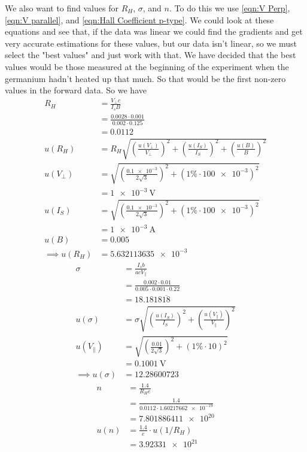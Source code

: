 \documentclass[12pt]{article}
\numberwithin{equation}{section}
\numberwithin{figure}{section}
\numberwithin{table}{section}
\begin{document}
    We also want to find values for $R_H$, $\sigma$, and $n$. To do this we use 
    \autoref{eqn:V Perp}, \autoref{eqn:V parallel}, and \autoref{eqn:Hall Coefficient p-type}. 
    We could look at these equations and see that, if the data was linear we could find the 
    gradients and get very accurate estimations for these values, but our data isn't linear, 
    so we must select the "best values" and just work with that. We have decided that the 
    best values would be those measured at the beginning of the experiment when the germanium 
    hadn't heated up that much. So that would be the first non-zero values in the forward data.
    \newline So we have
    \begin{align*}
        R_H&=\frac{V_\perp c}{I_s B}\\
        &=\frac{0.0028\cdot0.001}{0.002\cdot0.125}\\
        &=0.0112\\
        u(R_H)&=R_H\sqrt{\left(\frac{u(V_\perp)}{V_\perp}\right)^2+\left(\frac{u(I_S)}{I_S}\right)^2+\left(\frac{u(B)}{B}\right)^2}\\
        u(V_\perp)&=\sqrt{\left(\frac{\num{0.1e-3}}{2\sqrt3}\right)^2+(1\%\cdot \num{100e-3})^2}\\
        &=\SI{1e-3}{\volt}\\
        u(I_S)&=\sqrt{\left(\frac{\num{0.1e-3}}{2\sqrt3}\right)^2+(1\%\cdot \num{100e-3})^2}\\
        &=\SI{1e-3}{\ampere}\\
        u(B)&=0.005\\
        \implies u(R_H)&=\num{5.632113635e-3}
    \end{align*}
    \begin{align*}
        \sigma&=\frac{I_s b}{acV_\parallel}\\
        &=\frac{0.002\cdot0.01}{0.005\cdot0.001\cdot0.22}\\
        &=18.1818\overline{18}\\
        u(\sigma)&=\sigma\sqrt{\left(\frac{u(I_S)}{I_S}\right)^2+\left(\frac{u(V_\parallel)}{V_\parallel}\right)^2}\\
        u(V_\parallel)&=\sqrt{\left(\frac{0.01}{2\sqrt3}\right)^2+(1\%\cdot 10)^2}\\
        &=\SI{0.1001}{\volt}\\
        \implies u(\sigma)&=12.28600723
    \end{align*}
    \begin{align*}
        n&=\frac{1.4}{R_H e}\\
        &=\frac{1.4}{0.0112\cdot\num{1.60217662e-19}}\\
        &=\num{7.801886411e20}\\
        u(n)&=\frac{1.4}{e}\cdot u(1/R_H)\\
        &=\num{3.92331e21}
    \end{align*}
\end{document}
